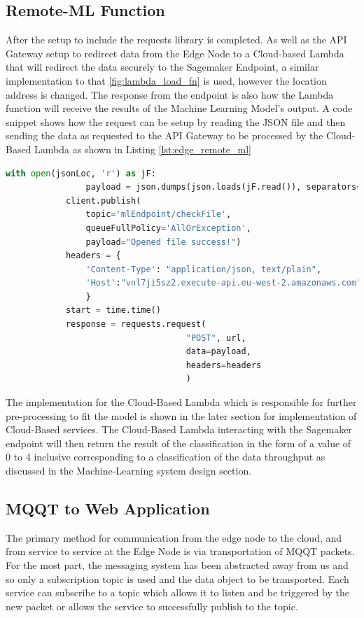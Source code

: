 \subsection{Remote-ML Function}
After the setup to include the requests library is completed. As well as the API Gateway setup to redirect data from the Edge Node to a Cloud-based Lambda that will redirect the data securely to the Sagemaker Endpoint, a similar implementation to that \ref{fig:lambda_load_fn} is used, however the location address is changed. The response from the endpoint is also how the Lambda function will receive the results of the Machine Learning Model's output. A code snippet shows how the request can be setup by reading the JSON file and then sending the data as requested to the API Gateway to be processed by the Cloud-Based Lambda as shown in Listing \ref{lst:edge_remote_ml}
\begin{lstlisting}[language=Python, caption={Sending Data to API Gateway to Invoke Cloud-Based Lambda for Sagemaker Endpoint}, label={lst:edge_remote_ml}]
with open(jsonLoc, 'r') as jF:
                payload = json.dumps(json.loads(jF.read()), separators=(',',':'))
            client.publish(
                topic='mlEndpoint/checkFile', 
                queueFullPolicy='AllOrException', 
                payload="Opened file success!")
            headers = {
                'Content-Type': "application/json, text/plain",
                'Host':"vnl7ji5sz2.execute-api.eu-west-2.amazonaws.com",
                }
            start = time.time()
            response = requests.request(
                                    "POST", url, 
                                    data=payload, 
                                    headers=headers
                                    )

\end{lstlisting}
The implementation for the Cloud-Based Lambda which is responsible for further pre-processing to fit the model is shown in the later section for implementation of Cloud-Based services. The Cloud-Based Lambda interacting with the Sagemaker endpoint will then return the result of the classification in the form of a value of 0 to 4 inclusive corresponding to a classification of the data throughput as discussed in the Machine-Learning system design section.


\subsection{MQQT to Web Application}
The primary method for communication from the edge node to the cloud, and from service to service at the Edge Node is via transportation of MQQT packets. For the most part, the messaging system has been abstracted away from us and so only a subscription topic is used and the data object to be transported. Each service can subscribe to a topic which allows it to listen and be triggered by the new packet or allows the service to successfully publish to the topic.

